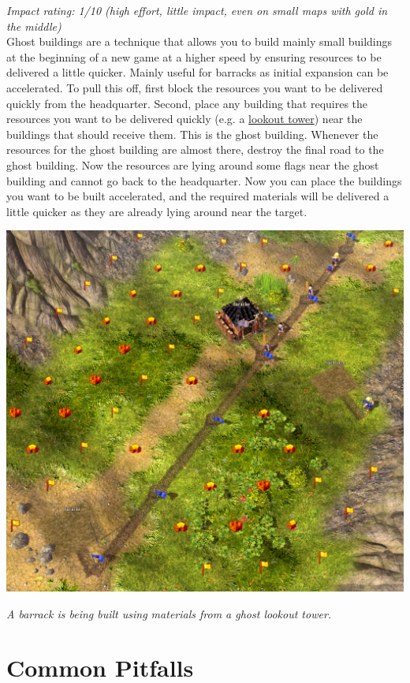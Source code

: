 \documentclass[12pt]{article}
\begin{document}
\textit{Impact rating: 1/10 (high effort, little impact, even on small maps with gold in the middle)}\\

Ghost buildings are a technique that allows you to build mainly small buildings at the beginning of a new game at a higher speed by ensuring resources to be delivered a little quicker. Mainly useful for barracks as initial expansion can be accelerated.
To pull this off, first block the resources you want to be delivered quickly from the headquarter. Second, place any building that requires the resources you want to be delivered quickly (e.g. a \hyperref[sec:lookouttower]{lookout tower}) near the buildings that should receive them. This is the ghost building. Whenever the resources for the ghost building are almost there, destroy the final road to the ghost building. Now the resources are lying around some flags near the ghost building and cannot go back to the headquarter. Now you can place the buildings you want to be built accelerated, and the required materials will be delivered a little quicker as they are already lying around near the target.

\includegraphics[width=\textwidth]{ghostbuilding_crop}

\textit{A barrack is being built using materials from a ghost lookout tower.}


\section{Common Pitfalls}
\label{sec:commonpitfalls}
\end{document}
